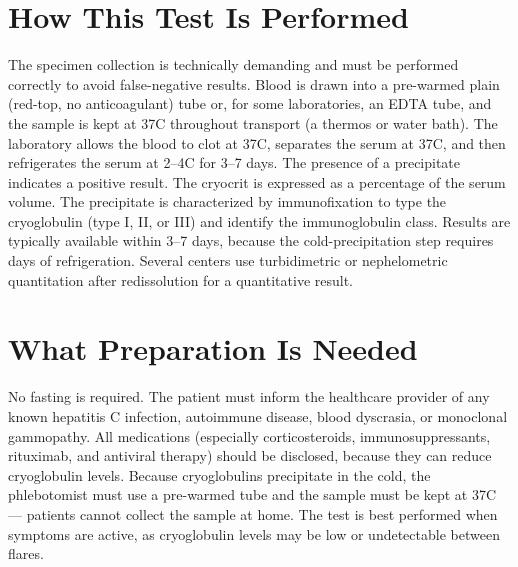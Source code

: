 \section*{How This Test Is Performed}
The specimen collection is technically demanding and must be performed correctly to avoid false-negative results. Blood is drawn into a pre-warmed plain (red-top, no anticoagulant) tube or, for some laboratories, an EDTA tube, and the sample is kept at 37\textdegree{}C throughout transport (a thermos or water bath). The laboratory allows the blood to clot at 37\textdegree{}C, separates the serum at 37\textdegree{}C, and then refrigerates the serum at 2--4\textdegree{}C for 3--7 days. The presence of a precipitate indicates a positive result. The cryocrit is expressed as a percentage of the serum volume. The precipitate is characterized by immunofixation to type the cryoglobulin (type I, II, or III) and identify the immunoglobulin class. Results are typically available within 3--7 days, because the cold-precipitation step requires days of refrigeration. Several centers use turbidimetric or nephelometric quantitation after redissolution for a quantitative result.

\section*{What Preparation Is Needed}
No fasting is required. The patient must inform the healthcare provider of any known hepatitis C infection, autoimmune disease, blood dyscrasia, or monoclonal gammopathy. All medications (especially corticosteroids, immunosuppressants, rituximab, and antiviral therapy) should be disclosed, because they can reduce cryoglobulin levels. Because cryoglobulins precipitate in the cold, the phlebotomist must use a pre-warmed tube and the sample must be kept at 37\textdegree{}C --- patients cannot collect the sample at home. The test is best performed when symptoms are active, as cryoglobulin levels may be low or undetectable between flares.

